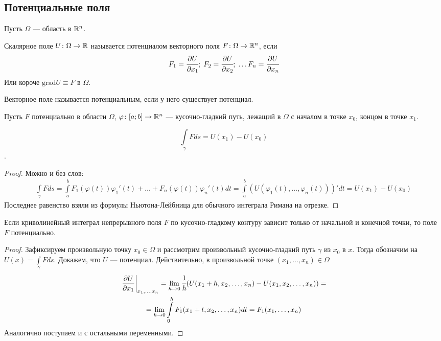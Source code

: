 \subsection{Потенциальные поля}
Пусть $\Omega$ --- область в $\mathbb{R}^n$.
\begin{Def}
    Скалярное поле $U\colon \Omega \to \mathbb{R}$ называется потенциалом векторного поля $F \colon \Omega \to \mathbb{R}^n$, если 
    $$
        F_1 = \cfrac{\partial U}{\partial x_1};\; F_2 = \cfrac{\partial U}{\partial x_2};\; \ldots F_n = \cfrac{\partial U}{\partial x_n}
    $$
    Или короче $\mathrm{grad}U\equiv F$ в $\Omega$.
\end{Def}
\begin{Def}
    Векторное поле называется потенциальным, если у него существует потенциал.
\end{Def}
Пусть $F$ потенциально в области $\Omega$, $\varphi\colon [a;b] \to \mathbb{R}^n$ --- кусочно-гладкий путь, лежащий в $\Omega$ с началом в точке $x_{0}$, концом в точке $x_1$.
\begin{Statement}
    $$ \int\limits_\gamma Fds = U(x_1) - U(x_0) $$.
\end{Statement}
\begin{proof}
    Можно и без слов:
    \begin{gather}
        \int\limits_\gamma Fds = \int\limits_a^b F_1(\varphi(t))\varphi_1'(t) + \ldots + F_n(\varphi(t))\varphi_n'(t)dt = \int\limits_a^b (U(\varphi_1(t), \ldots, \varphi_n(t)))'dt = U(x_1) - U(x_0)
    \end{gather}
    Последнее равенство взяли из формулы Ньютона-Лейбница для обычного интеграла Римана на отрезке.
\end{proof}
\begin{Statement}
    Если криволинейный интеграл непрерывного поля $F$ по кусочно-гладкому контуру зависит только от начальной и конечной точки, то поле $F$ потенциально.
\end{Statement}
\begin{proof}
    Зафиксируем произвольную точку $x_0 \in \Omega$ и рассмотрим произвольный кусочно-гладкий путь $\gamma$ из $x_0$ в $x$. Тогда обозначим на $U(x) = \int\limits_\gamma Fds$. Докажем, что $U$ --- потенциал. Действительно, в произвольной точке $(x_1, \ldots, x_n) \in \Omega$ 
    \begin{gather}
    \left.\frac{\partial U}{\partial x_1}\right|_{x_1, \ldots, x_n} = \lim\limits_{h \to 0}\cfrac{1}{h}(U(x_1 + h, x_2, \ldots, x_n) - U(x_1, x_2, \ldots, x_n)) =\\
    = \lim\limits_{h\to 0}\int\limits_{0}^{h} F_1(x_1 + t, x_2, \ldots, x_n)dt = F_1(x_1, \ldots, x_n)
    \end{gather}
    Аналогично поступаем и с остальными переменными.
\end{proof}
